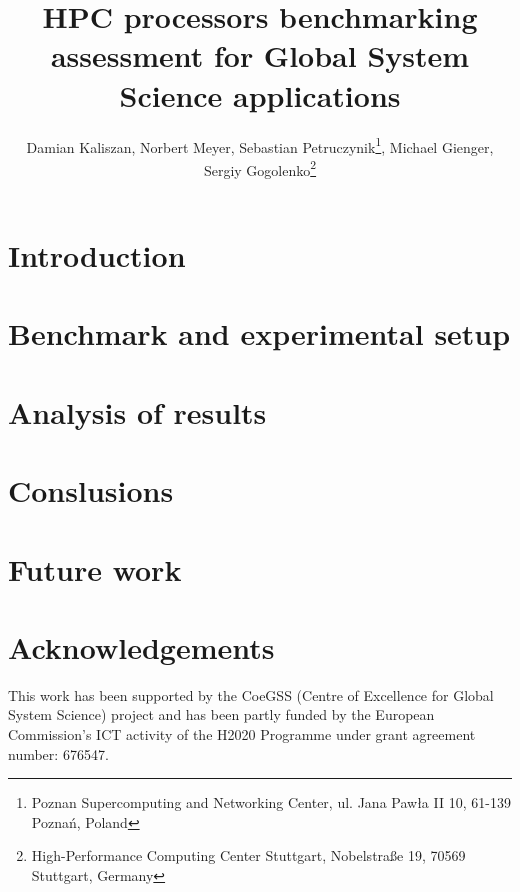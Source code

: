 \documentclass{superfri}
\begin{document}
\author{Damian Kaliszan, Norbert Meyer, Sebastian Petruczynik\footnote{\label{psnc}Poznan Supercomputing and Networking Center, ul. Jana Paw\l a II 10, 61-139 Pozna\'n, Poland}, Michael Gienger, Sergiy Gogolenko\footnote{\label{hlrs}High-Performance Computing Center Stuttgart, Nobelstra\ss{}e 19, 70569 Stuttgart, Germany}}



\title{HPC processors benchmarking assessment for Global System Science applications}

\maketitle{}





\section*{Introduction}
\label{sec:intro}


\section{Benchmark and experimental setup}
\label{sec:benchmark}




\section{Analysis of results}
\label{sec:analysis}


\section{Conslusions}
\label{sec:summary}


\section{Future work}
\label{sec:future_work}


\section*{Acknowledgements}
This work has been supported by the CoeGSS (Centre of Excellence for Global System Science) project and has been partly funded by the European Commission's ICT activity of the H2020 Programme under grant agreement number: 676547.

\openaccess


\end{document}

